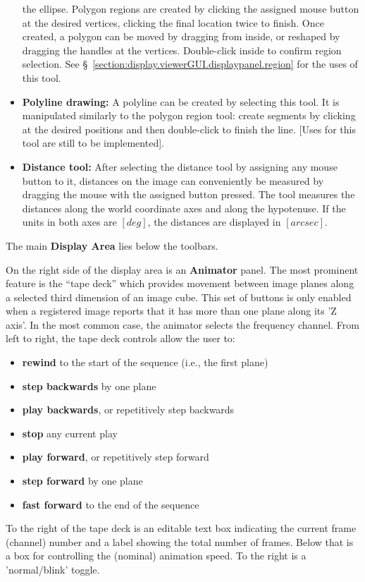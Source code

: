 \begin{itemize}
     the ellipse.
     Polygon regions are created by clicking the assigned mouse button
     at the desired vertices, clicking the final location twice to finish.
     Once created, a polygon can be moved by dragging from inside, or
     reshaped by dragging the handles at the vertices.  Double-click inside to
     confirm region selection.
     See \S~\ref{section:display.viewerGUI.displaypanel.region} for the uses
     of this tool.
   \item {\bf Polyline drawing:}
     A polyline can be created by selecting this tool. It is manipulated
     similarly to the polygon region tool: create segments by clicking at
     the desired positions and then double-click to finish the line.
     [Uses for this tool are still to be implemented].
   \item {\bf Distance tool:}
     After selecting the distance tool by assigning any mouse button to it,
     distances on the image can conveniently be measured by dragging the
     mouse with the assigned button pressed. The tool measures the distances
     along the world coordinate axes and along the hypotenuse. If the units
     in both axes are $[deg]$, the distances are displayed in $[arcsec]$.
\end{itemize}

The main {\bf Display Area} lies below the toolbars.

On the right side of the display area is an {\bf Animator} panel.  The most prominent
feature is the ``tape deck'' which provides movement between image planes
along a selected third dimension of an image cube. This set of buttons is
only enabled when a registered image reports that it has more than one plane
along its 'Z axis'. In the most common case, the animator selects the frequency
channel. From left to right, the tape deck controls allow the user to:
\begin{itemize}
   \item {\bf rewind} to the start of the sequence (i.e., the first plane)
   \item {\bf step backwards} by one plane
   \item {\bf play backwards}, or repetitively step backwards
   \item {\bf stop} any current play
   \item {\bf play forward}, or repetitively step forward
   \item {\bf step forward} by one plane
   \item {\bf fast forward} to the end of the sequence
\end{itemize}
To the right of the tape deck is an editable text box indicating the
current frame (channel) number and a label showing the total number of
frames. Below that is a box for controlling the (nominal) animation
speed. To the right is a 'normal/blink' toggle.

